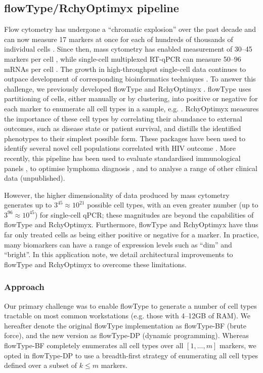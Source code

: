 \subsection{flowType/RchyOptimyx pipeline}
\label{sec:fcs:flowtype-rchy}
 Flow cytometry has undergone a ``chromatic explosion'' over the past decade and can now measure 17 markers at once for each of hundreds of thousands of individual cells \cite{Chattopadhyay2008}.
Since then, mass cytometry has enabled measurement of 30--45 markers per cell \cite{Bendall2012a}, while single-cell multiplexed RT-qPCR can measure 50--96 mRNAs per cell \cite{White2011}. 
The growth in high-throughput single-cell data continues to outpace development of corresponding bioinformatics techniques \cite{Chattopadhyay2008}.
To answer this challenge, we previously developed flowType \cite{Aghaeepour2012} and RchyOptimyx \cite{Aghaeepour2012a}. 
flowType uses partitioning of cells, either manually or by clustering, into positive or negative for each marker to enumerate all cell types in a sample, e.g. \cite{Aghaeepour2013Critical}.
RchyOptimyx measures the importance of these cell types by correlating their abundance to external outcomes, such as disease state or patient survival, and distills the identified phenotypes to their simplest possible form. 
These packages have been used to identify several novel cell populations correlated with HIV outcome \cite{Aghaeepour2012}. 
More recently, this pipeline has been used to evaluate standardised immunological panels \cite{Villanovaa2013Computational}, to optimise lymphoma diagnosis \cite{Craig2013Computational}, and to analyse a range of other clinical data (unpublished).

However, the higher dimensionality of data produced by mass cytometry generates up to $3^{45}\approx10^{21}$ possible cell types, with an even greater number (up to $3^{96}\approx10^{45}$) for single-cell qPCR; these magnitudes are beyond the capabilities of flowType and RchyOptimyx.
Furthermore, flowType and RchyOptimyx have thus far only treated cells as being either positive or negative for a marker.
In practice, many biomarkers can have a range of expression levels such as ``dim'' and ``bright''. 
In this application note, we detail architectural improvements to flowType and RchyOptimyx to overcome these limitations.  
\subsubsection{Approach}
Our primary challenge was to enable flowType to generate a number of cell types tractable on most common workstations (e.g. those with 4--12GB of RAM).
We hereafter denote the original flowType implementation as flowType-BF (brute force), and the new version as flowType-DP (dynamic programming).
Whereas flowType-BF completely enumerates all cell types over all $[1,...,m]$ markers, we opted  in flowType-DP to use a breadth-first strategy of enumerating all cell types defined over a subset of $k\leq m$ markers.

